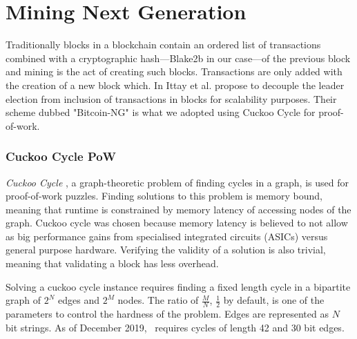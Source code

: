 \section{Mining Next Generation}
\label{sect:mining}

Traditionally blocks in a blockchain contain an ordered list of transactions
combined with a cryptographic hash---Blake2b \cite{aumasson2013blake2} in our
case---of the previous block \cite{whatisablockchain,raikwar2019sok} and mining
is the act of creating such blocks. Transactions are only added with the
creation of a new block which. In \cite{Eyal:2016:BSB:2930611.2930615}
Ittay et al. propose to decouple the leader election from inclusion of
transactions in blocks for scalability purposes. Their scheme dubbed
"Bitcoin-NG" is what we adopted using Cuckoo Cycle for proof-of-work.


\subsubsection{Cuckoo Cycle PoW}

\textit{Cuckoo Cycle} \cite{Tromp2015CuckooCA}, a graph-theoretic problem of
finding cycles in a graph, is used for proof-of-work puzzles. Finding solutions
to this problem is memory bound, meaning that runtime is constrained by memory
latency of accessing nodes of the graph. Cuckoo cycle was chosen because memory
latency is believed to not allow as big performance gains from specialised
integrated circuits (ASICs) versus general purpose hardware. Verifying the
validity of a solution is also trivial, meaning that validating a block has
less overhead.

Solving a cuckoo cycle instance requires finding a fixed length cycle in a
bipartite graph of $2^N$ edges and $2^M$ nodes. The ratio of $\frac{M}{N}$,
$\frac{1}{2}$ by default, is one of the parameters to control the hardness of
the problem. Edges are represented as $N$ bit strings.
As of December 2019, \aet\ requires cycles of length 42 and 30 bit edges.


